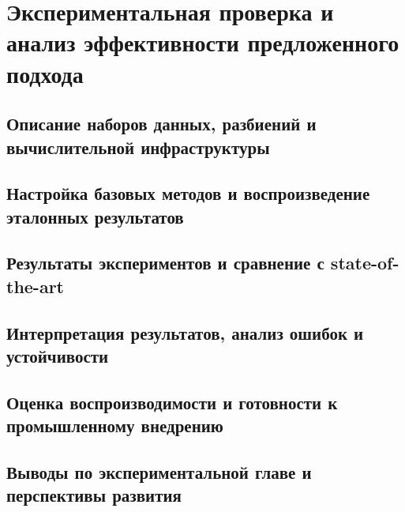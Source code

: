 \section[Экспериментальная проверка и анализ эффективности подхода]{Экспериментальная проверка и анализ эффективности предложенного подхода}
\label{sec:chapter3}

\subsection{Описание наборов данных, разбиений и вычислительной инфраструктуры}
\label{sec:ch3-1}

\subsection{Настройка базовых методов и воспроизведение эталонных результатов}
\label{sec:ch3-2}

\subsection{Результаты экспериментов и сравнение с state-of-the-art}
\label{sec:ch3-3}

\subsection{Интерпретация результатов, анализ ошибок и устойчивости}
\label{sec:ch3-4}

\subsection{Оценка воспроизводимости и готовности к промышленному внедрению}
\label{sec:ch3-5}

\subsection{Выводы по экспериментальной главе и перспективы развития}
\label{sec:ch3-6}
